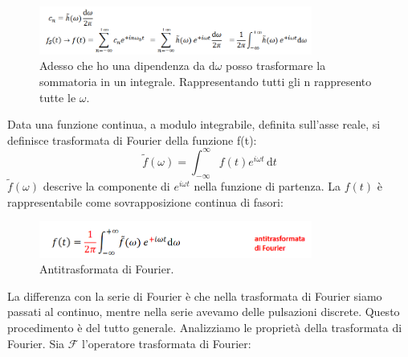 \begin{figure}[H]
	\centering
	\includegraphics[width=0.8\textwidth]{2024-03-07-09-29-55.png}
	\caption{Adesso che ho una dipendenza da \(\mathrm{d}\omega  \) posso trasformare la sommatoria in un integrale. Rappresentando tutti gli n rappresento tutte le \(\omega \).  }
\end{figure}

\begin{definition}
	Data una funzione continua, a modulo integrabile, definita sull'asse reale, si definisce trasformata di Fourier della funzione f(t):
	\[
		\widetilde{f}(\omega )=\int_{-\infty}^{\infty} f(t)e^{i \omega t} \,\mathrm{d}t  
	\]
	\(\widetilde{f}(\omega ) \) descrive la componente di \(e^{i \omega t}\) nella funzione di partenza. La \(f(t)\) è rappresentabile come sovrapposizione continua di fasori:
	\begin{figure}[H]
		\centering
		\includegraphics[width=0.8\textwidth]{2024-03-07-09-36-07.png}
		\caption{Antitrasformata di Fourier.}
	\end{figure}   
\end{definition}

La differenza con la serie di Fourier è che nella trasformata di Fourier siamo passati al continuo, mentre nella serie avevamo delle pulsazioni discrete. Questo procedimento è del tutto generale. Analizziamo le proprietà della trasformata di Fourier. Sia \(\mathcal{F} \) l'operatore trasformata di Fourier:


